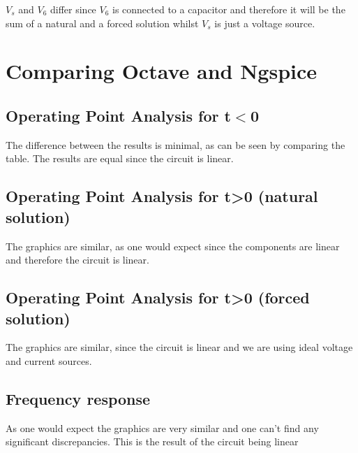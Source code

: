 $V_s$ and $V_6$ differ since $V_6$ is connected to a capacitor and therefore it will be the sum of a natural and a forced solution whilst $V_s$ is just a voltage source. %

\section{Comparing Octave and Ngspice}

\subsection{Operating Point Analysis for t$<$0}
\tab The difference between the results is minimal, as can be seen by comparing the table. The results are equal since the circuit is linear.

\par

\subsection{Operating Point Analysis for t>0 (natural solution)}
The graphics are similar, as one would expect since the components are linear and therefore the circuit is linear.
\par

\subsection{Operating Point Analysis for t>0 (forced solution)}

The graphics are similar, since the circuit is linear and we are using ideal voltage and current sources.


\subsection{Frequency response}

As one would expect the graphics are very similar and one can't find any significant discrepancies. This is the result of the circuit being linear
